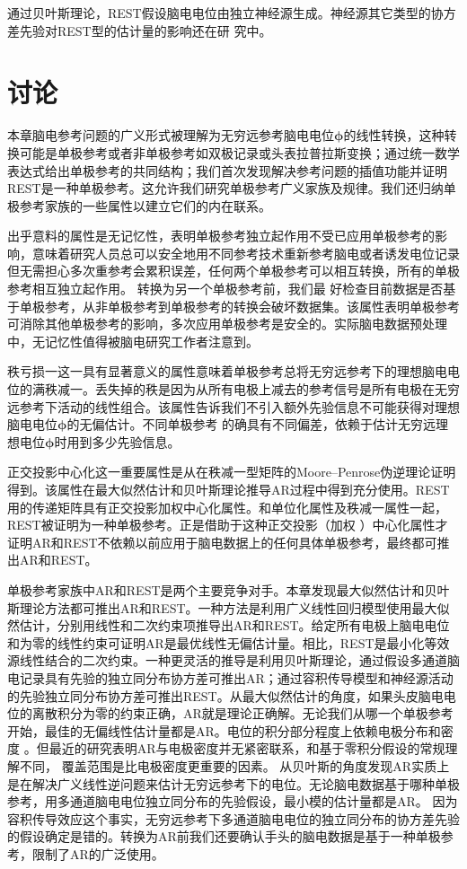 通过贝叶斯理论，REST假设脑电电位由独立神经源生成。神经源其它类型的协方差先验对REST型的估计量的影响还在研
究中。 
\section{讨论}
本章脑电参考问题的广义形式被理解为无穷远参考脑电电位$\mathbf{\phi}$的线性转换，这种转换可能是单极参考或者非单极参考如双极记录或头表拉普拉斯变换；通过统一数学表达式给出单极参考的共同结构；我们首次发现解决参考问题的插值功能并证明REST是一种单极参考。这允许我们研究单极参考广义家族及规律。我们还归纳单极参考家族的一些属性以建立它们的内在联系。 

出乎意料的属性是无记忆性，表明单极参考独立起作用不受已应用单极参考的影响，意味着研究人员总可以安全地用不同参考技术重新参考脑电或者诱发电位记录但无需担心多次重参考会累积误差，任何两个单极参考可以相互转换，所有的单极参考相互独立起作用。 转换为另一个单极参考前，我们最
好检查目前数据是否基于单极参考，从非单极参考到单极参考的转换会破坏数据集。该属性表明单极参考可消除其他单极参考的影响，多次应用单极参考是安全的。实际脑电数据预处理中，无记忆性值得被脑电研究工作者注意到。

秩亏损一这一具有显著意义的属性意味着单极参考总将无穷远参考下的理想脑电电位的满秩减一。丢失掉的秩是因为从所有电极上减去的参考信号是所有电极在无穷远参考下活动的线性组合。该属性告诉我们不引入额外先验信息不可能获得对理想脑电电位$\mathbf{\phi}$的无偏估计。不同单极参考
的确具有不同偏差，依赖于估计无穷远理想电位$\mathbf{\phi}$时用到多少先验信息。

正交投影中心化这一重要属性是从在秩减一型矩阵的Moore–Penrose伪逆理论证明得到。该属性在最大似然估计和贝叶斯理论推导AR过程中得到充分使用。REST用的传递矩阵具有正交投影加权中心化属性。和单位化属性及秩减一属性一起，REST被证明为一种单极参考。正是借助于这种正交投影（加权
）中心化属性才证明AR和REST不依赖以前应用于脑电数据上的任何具体单极参考，最终都可推出AR和REST。

单极参考家族中AR和REST是两个主要竞争对手。本章发现最大似然估计和贝叶斯理论方法都可推出AR和REST。一种方法是利用广义线性回归模型使用最大似然估计，分别用线性和二次约束项推导出AR和REST。给定所有电极上脑电电位和为零的线性约束可证明AR是最优线性无偏估计量。相比，REST是最小化等效源线性结合的二次约束。一种更灵活的推导是利用贝叶斯理论，通过假设多通道脑电记录具有先验的独立同分布协方差可推出AR；通过容积传导模型和神经源活动的先验独立同分布协方差可推出REST。从最大似然估计的角度，如果头皮脑电电位的离散积分为零的约束正确，AR就是理论正确解。无论我们从哪一个单极参考开始，最佳的无偏线性估计量都是AR。电位的积分部分程度上依赖电极分布和密度
。但最近的研究表明AR与电极密度并无紧密联系，和基于零积分假设的常规理解不同，
覆盖范围是比电极密度更重要的因素。 从贝叶斯的角度发现AR实质上是在解决广义线性逆问题来估计无穷远参考下的电位。无论脑电数据基于哪种单极参考，用多通道脑电电位独立同分布的先验假设，最小模的估计量都是AR。 因为容积传导效应这个事实，无穷远参考下多通道脑电电位的独立同分布的协方差先验的假设确定是错的。转换为AR前我们还要确认手头的脑电数据是基于一种单极参考，限制了AR的广泛使用。

